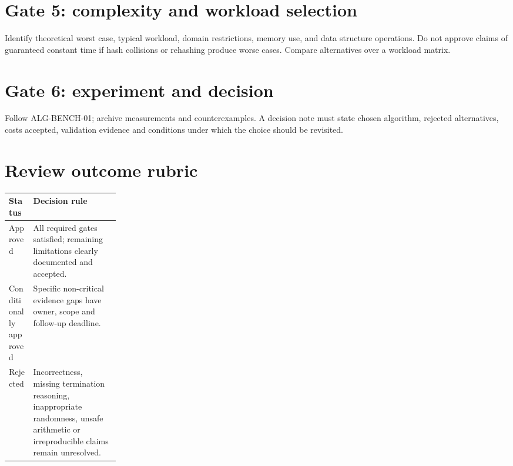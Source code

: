 \documentclass[11pt,letterpaper]{article}
\begin{document}
\section{Gate 5: complexity and workload selection}
Identify theoretical worst case, typical workload, domain restrictions, memory use, and data structure operations. Do not approve claims of guaranteed constant time if hash collisions or rehashing produce worse cases. Compare alternatives over a workload matrix.
\section{Gate 6: experiment and decision}
Follow ALG-BENCH-01; archive measurements and counterexamples. A decision note must state chosen algorithm, rejected alternatives, costs accepted, validation evidence and conditions under which the choice should be revisited.
\section{Review outcome rubric}
\begin{tabularx}{\linewidth}{@{}>{\raggedright\arraybackslash}p{0.22\linewidth}>{\raggedright\arraybackslash}X@{}}\toprule Status & Decision rule\\\midrule
Approved & All required gates satisfied; remaining limitations clearly documented and accepted.\\
Conditionally approved & Specific non-critical evidence gaps have owner, scope and follow-up deadline.\\
Rejected & Incorrectness, missing termination reasoning, inappropriate randomness, unsafe arithmetic or irreproducible claims remain unresolved.\\
\bottomrule\end{tabularx}
\end{document}
